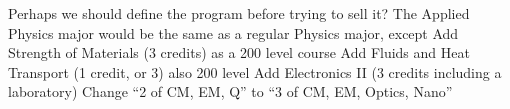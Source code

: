 \documentclass[12pt,preprint]{aastex}
\begin{document}
%
%
%

Perhaps we should define the program before trying to sell it?
The Applied Physics major would be the same as a regular Physics major, except
Add Strength of Materials (3 credits) as a 200 level course
Add Fluids and Heat Transport (1 credit, or 3) also 200 level
Add Electronics II (3 credits including a laboratory)
Change “2 of CM, EM, Q” to “3 of CM, EM, 
Optics, Nano”
\end{document}

